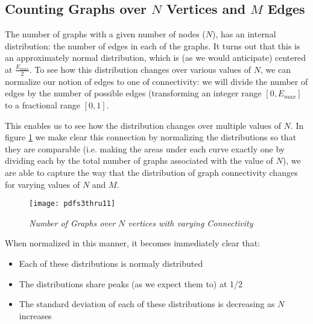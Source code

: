 \subsection{Counting Graphs over $N$ Vertices and $M$ Edges}

The number of graphs with a given number of nodes ($N$), has an internal distribution: the number of edges in each of the graphs.
It turns out that this is an approximately normal distribution, which is (as we would anticipate) centered at $\frac{E_{max}}{2}$. 
To see how this distribution changes over various values of $N$, we can normalize our notion of edges to one of connectivity:
we will divide the number of edges by the number of possible edges (transforming an integer range $[0, E_{max}]$ to a fractional range $[0, 1]$.

This enables us to see how the distribution changes over multiple values of $N$.
In figure \ref{fig:ngraphs} we make clear this connection by normalizing the distributions so that they are comparable (i.e. making the areas under each curve exactly one by dividing each by the total number of graphs associated with the value of $N$), we are able to capture the way that the distribution of graph connectivity changes for varying values of $N$ and $M$.

\begin{figure}[h]
\caption{\emph{Number of Graphs over $N$ vertices with varying Connectivity}}
\centering
\texttt{[image: pdfs3thru11]}
\label{fig:ngraphs}
\end{figure}

When normalized in this manner, it becomes immediately clear that:
\begin{itemize}
\item{Each of these distributions is normaly distributed}
\item{The distributions share peaks (as we expect them to) at 1/2}
\item{The standard deviation of each of these distributions is decreasing as $N$ increases}
\end{itemize}

